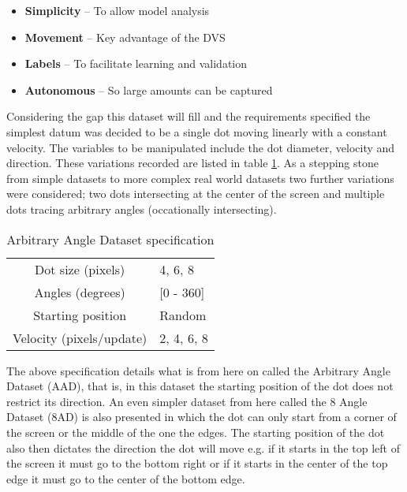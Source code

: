 \begin{itemize}
    \itemsep-0.5em
    \item \textbf{Simplicity} -- To allow model analysis 
    \item \textbf{Movement} -- Key advantage of the DVS
    \item \textbf{Labels} -- To facilitate learning and validation
    \item \textbf{Autonomous} -- So large amounts can be captured
\end{itemize}

Considering the gap this dataset will fill and the requirements specified the simplest datum was decided to be a single dot moving linearly with a constant velocity. 
The variables to be manipulated include the dot diameter, velocity and direction. 
These variations recorded are listed in table \ref{tb:datasetspecs}.
As a stepping stone from simple datasets to more complex real world datasets two further variations were considered; two dots intersecting at the center of the screen and multiple dots tracing arbitrary angles (occationally intersecting).  

\begin{table}[h]
\centering
\begin{tabular}{ | c | l | }
    \hline
    Dot size (pixels) & 4, 6, 8 \\
    Angles (degrees) & [0 - 360] \\
    Starting position & Random \\
    Velocity (pixels/update) & 2, 4, 6, 8 \\
    \hline
\end{tabular}
\caption{Arbitrary Angle Dataset specification}
\label{tb:datasetspecs}
\end{table}

The above specification details what is from here on called the Arbitrary Angle Dataset (AAD), that is, in this dataset the starting position of the dot does not restrict its direction.
An even simpler dataset from here called the 8 Angle Dataset (8AD) is also presented in which the dot can only start from a corner of the screen or the middle of the one the edges.
The starting position of the dot also then dictates the direction the dot will move e.g. if it starts in the top left of the screen it must go to the bottom right or if it starts in the center of the top edge it must go to the center of the bottom edge.

